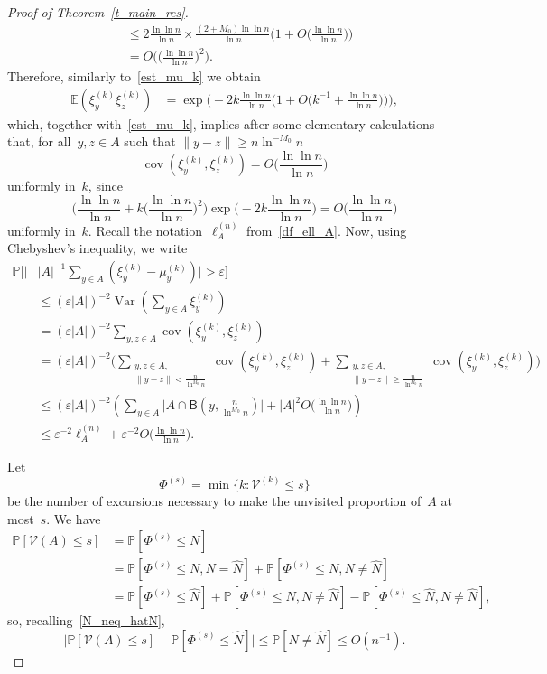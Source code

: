 \documentclass[11pt]{article}
\theoremstyle{definition}
\numberwithin{equation}{section}
\numberwithin{figure}{section}
\numberwithin{table}{section}
\DeclareMathOperator{\cov}{cov}
\DeclareMathOperator{\Var}{Var}
\newcommand{\1}[1]{{\mathbf 1}{\{#1\}}}
\newcommand{\eps}{\varepsilon}
\newcommand{\V}{{\mathcal V}}
\newcommand{\hN}{{\widehat N}}
\newcommand{\8}{{\infty}}
\newcommand{\IP}{{\mathbb P}}
\newcommand{\IE}{{\mathbb E}}
\newcommand{\B}{{\mathsf B}}
\begin{document}
\begin{proof}[Proof of Theorem~\ref{t_main_res}]
\begin{align*}
&\leq 2\frac{\ln\ln n}{\ln n} \times \frac{(2+M_0)\ln\ln n}{\ln n}
\Big(1+O\Big(\frac{\ln\ln n}{\ln n}\Big)\Big)\\
&= O\Big(\Big(\frac{\ln\ln n}{\ln n}\Big)^2\Big).
\end{align*}
Therefore, similarly to~\eqref{est_mu_k} we obtain
\begin{align*}
\IE(\xi_y^{(k)}\xi_z^{(k)}) &= \exp\Big(-2k\frac{\ln\ln n}{\ln n}
\Big(1+O\Big(k^{-1}+\frac{\ln\ln n}{\ln n}\Big)\Big)\Big),
\end{align*}
which, together with~\eqref{est_mu_k}, implies after some elementary calculations that, for all~$y,z\in A$ such that $\|y-z\|\geq n\ln^{-M_0}n$
\begin{equation}\label{est_cov}
\cov (\xi_y^{(k)},\xi_z^{(k)}) = O\Big(\frac{\ln\ln n}{\ln n}\Big)
\end{equation}
uniformly in~$k$, since
\[
\Bigg(\frac{\ln\ln n}{\ln n} + k\Big(\frac{\ln\ln n}{\ln n}\Big)^2
\Bigg) \exp\Big(-2k\frac{\ln\ln n}{\ln n}\Big) = O\Big(\frac{\ln\ln n}{\ln n}\Big)
\]
uniformly in~$k$. Recall the notation~$\ell^{(n)}_A$ from~\eqref{df_ell_A}. Now, using Chebyshev's inequality, we write
\begin{align}
\IP\Big[\Big|&|A|^{-1}\sum_{y\in A}(\xi_y^{(k)} -\mu_y^{(k)})\Big|>\eps\Big]\nonumber\\
&\leq (\eps|A|)^{-2} \Var \left(\sum_{y\in A}\xi_y^{(k)}\right)
\nonumber\\
&= (\eps|A|)^{-2} \sum_{y,z\in A}\cov (\xi_y^{(k)},\xi_z^{(k)})
\nonumber\\
&= (\eps|A|)^{-2} \Bigg(\sum_{\substack{y,z\in A,\\
\|y-z\|< \frac{n}{\ln^{M_0}n}}} \cov (\xi_y^{(k)},\xi_z^{(k)}) + \sum_{\substack{y,z\in A,\\
\|y-z\|\geq \frac{n}{\ln^{M_0}n}}}
\cov (\xi_y^{(k)},\xi_z^{(k)}) \Bigg)
\nonumber\\
&\leq (\eps|A|)^{-2} \left(\sum_{y\in A} \big|A\cap \B(y,\tfrac{n}{\ln^{M_0}n})\big| + |A|^2 O\Big(\frac{\ln\ln n}{\ln n}\Big) \right)\nonumber\\
&\leq \eps^{-2}
\ell^{(n)}_A + \eps^{-2} O\Big(\frac{\ln\ln n}{\ln n} \Big).\label{bigcalc_Cheb}
\end{align}

Let
\[
\Phi^{(s)} = \min\big\{k: \V^{(k)}\leq s\big\}
\]
be the number of excursions necessary to make the unvisited proportion of~$A$ at most~$s$. We have
\begin{align*}
\IP[\V(A)\leq s] & = \IP[\Phi^{(s)}\leq N]\\
&= \IP[\Phi^{(s)}\leq N,N=\hN] +
\IP[\Phi^{(s)}\leq N,N\neq \hN]\\
&= \IP[\Phi^{(s)}\leq \hN] + \IP[\Phi^{(s)}\leq N,N\neq \hN] - \IP[\Phi^{(s)}\leq \hN,N\neq \hN],
\end{align*}
so, recalling~\eqref{N_neq_hatN},
\begin{equation}\label{V_Phi_hatN}
\big|\IP[\V(A)\leq s] - \IP[\Phi^{(s)}\leq \hN]\big|
\leq \IP[N\neq \hN] \leq O(n^{-1}).
\end{equation}


\end{proof}
\end{document}
